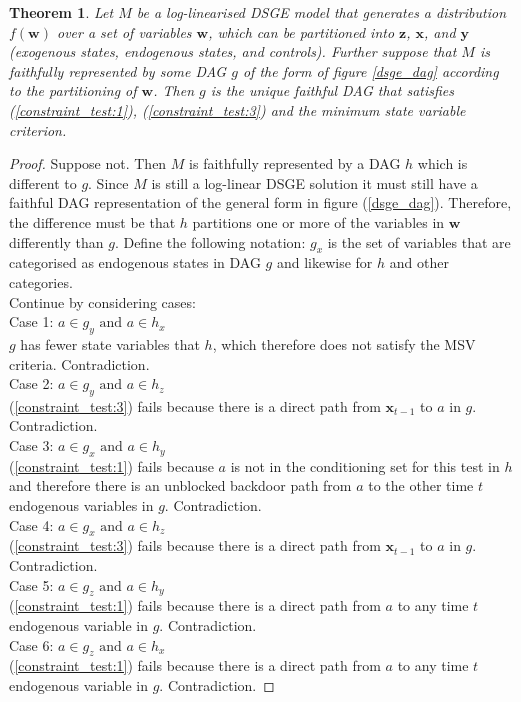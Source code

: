 \documentclass{article}
\newtheorem{theorem}{Theorem}
\begin{document}
\theoremstyle{definition}
\begin{theorem}
  Let $M$ be a log-linearised DSGE model that generates a distribution $f(\mathbf{w})$ over a set of variables $\mathbf{w}$, which can be partitioned into $\mathbf{z}$, $\mathbf{x}$, and $\mathbf{y}$ (exogenous states, endogenous states, and controls). Further suppose that $M$ is \textit{faithfully represented} by some DAG $g$ of the form of figure \ref{dsge_dag} according to the partitioning of $\mathbf{w}$. Then $g$ is the unique faithful DAG that satisfies (\ref{constraint_test:1}), (\ref{constraint_test:3}) and the minimum state variable criterion.
\end{theorem}
\begin{proof}
  Suppose not. Then $M$ is faithfully represented by a DAG $h$ which is different to $g$. Since $M$ is still a log-linear DSGE solution it must still have a faithful DAG representation of the general form in figure (\ref{dsge_dag}). Therefore, the difference must be that $h$ partitions one or more of the variables in $\mathbf{w}$ differently than $g$. Define the following notation: $g_x$ is the set of variables that are categorised as endogenous states in DAG  $g$ and likewise for $h$ and other categories. \\
  Continue by considering cases: \\
  Case 1: $a \in g_y \text{ and } a \in h_x$ \\
    $g$ has fewer state variables that $h$, which therefore does not satisfy the MSV criteria. Contradiction. \\
  Case 2: $a \in g_y \text{ and } a \in h_z$ \\
    (\ref{constraint_test:3}) fails because there is a direct path from $\mathbf{x}_{t-1}$ to $a$ in $g$. Contradiction. \\
  Case 3: $a \in g_x \text{ and } a \in h_y$ \\
    (\ref{constraint_test:1}) fails because $a$ is not in the conditioning set for this test in $h$ and therefore there is an unblocked backdoor path from $a$ to the other time $t$ endogenous variables in $g$. Contradiction. \\
  Case 4: $a \in g_x \text{ and } a \in h_z$ \\
    (\ref{constraint_test:3}) fails because there is a direct path from $\mathbf{x}_{t-1}$ to $a$ in $g$. Contradiction. \\
  Case 5: $a \in g_z \text{ and } a \in h_y$ \\
    (\ref{constraint_test:1}) fails because there is a direct path from $a$ to any time $t$ endogenous variable in $g$. Contradiction. \\
  Case 6: $a \in g_z \text{ and } a \in h_x$ \\
    (\ref{constraint_test:1}) fails because there is a direct path from $a$ to any time $t$ endogenous variable in $g$. Contradiction. 
\end{proof}
\end{document}
